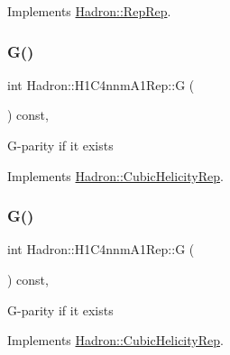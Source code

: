 Implements \mbox{\hyperlink{structHadron_1_1RepRep_a92c8802e5ed7afd7da43ccfd5b7cd92b}{Hadron\+::\+Rep\+Rep}}.

\mbox{\label{structHadron_1_1H1C4nnmA1Rep_ac499e4a61baff357ee922f30244b8067}} 
\subsubsection{\texorpdfstring{G()}{G()}\hspace{0.1cm}{\footnotesize\ttfamily [1/3]}}
{\footnotesize\ttfamily int Hadron\+::\+H1\+C4nnm\+A1\+Rep\+::G (\begin{DoxyParamCaption}{ }\end{DoxyParamCaption}) const\hspace{0.3cm}{\ttfamily [inline]}, {\ttfamily [virtual]}}

G-\/parity if it exists 

Implements \mbox{\hyperlink{structHadron_1_1CubicHelicityRep_a50689f42be1e6170aa8cf6ad0597018b}{Hadron\+::\+Cubic\+Helicity\+Rep}}.

\mbox{\label{structHadron_1_1H1C4nnmA1Rep_ac499e4a61baff357ee922f30244b8067}} 
\subsubsection{\texorpdfstring{G()}{G()}\hspace{0.1cm}{\footnotesize\ttfamily [2/3]}}
{\footnotesize\ttfamily int Hadron\+::\+H1\+C4nnm\+A1\+Rep\+::G (\begin{DoxyParamCaption}{ }\end{DoxyParamCaption}) const\hspace{0.3cm}{\ttfamily [inline]}, {\ttfamily [virtual]}}

G-\/parity if it exists 

Implements \mbox{\hyperlink{structHadron_1_1CubicHelicityRep_a50689f42be1e6170aa8cf6ad0597018b}{Hadron\+::\+Cubic\+Helicity\+Rep}}.

\mbox{\label{structHadron_1_1H1C4nnmA1Rep_ac499e4a61baff357ee922f30244b8067}} 
